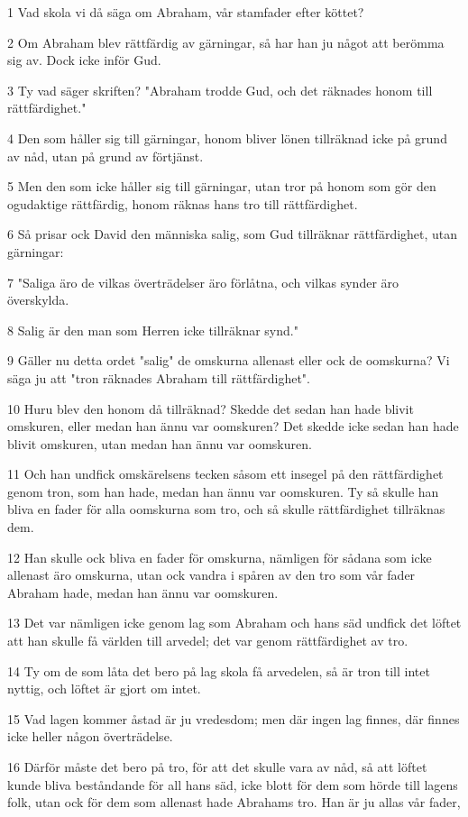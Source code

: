 \par 1 Vad skola vi då säga om Abraham, vår stamfader efter köttet?
\par 2 Om Abraham blev rättfärdig av gärningar, så har han ju något att berömma sig av. Dock icke inför Gud.
\par 3 Ty vad säger skriften? "Abraham trodde Gud, och det räknades honom till rättfärdighet."
\par 4 Den som håller sig till gärningar, honom bliver lönen tillräknad icke på grund av nåd, utan på grund av förtjänst.
\par 5 Men den som icke håller sig till gärningar, utan tror på honom som gör den ogudaktige rättfärdig, honom räknas hans tro till rättfärdighet.
\par 6 Så prisar ock David den människa salig, som Gud tillräknar rättfärdighet, utan gärningar:
\par 7 "Saliga äro de vilkas överträdelser äro förlåtna, och vilkas synder äro överskylda.
\par 8 Salig är den man som Herren icke tillräknar synd."
\par 9 Gäller nu detta ordet "salig" de omskurna allenast eller ock de oomskurna? Vi säga ju att "tron räknades Abraham till rättfärdighet".
\par 10 Huru blev den honom då tillräknad? Skedde det sedan han hade blivit omskuren, eller medan han ännu var oomskuren? Det skedde icke sedan han hade blivit omskuren, utan medan han ännu var oomskuren.
\par 11 Och han undfick omskärelsens tecken såsom ett insegel på den rättfärdighet genom tron, som han hade, medan han ännu var oomskuren. Ty så skulle han bliva en fader för alla oomskurna som tro, och så skulle rättfärdighet tillräknas dem.
\par 12 Han skulle ock bliva en fader för omskurna, nämligen för sådana som icke allenast äro omskurna, utan ock vandra i spåren av den tro som vår fader Abraham hade, medan han ännu var oomskuren.
\par 13 Det var nämligen icke genom lag som Abraham och hans säd undfick det löftet att han skulle få världen till arvedel; det var genom rättfärdighet av tro.
\par 14 Ty om de som låta det bero på lag skola få arvedelen, så är tron till intet nyttig, och löftet är gjort om intet.
\par 15 Vad lagen kommer åstad är ju vredesdom; men där ingen lag finnes, där finnes icke heller någon överträdelse.
\par 16 Därför måste det bero på tro, för att det skulle vara av nåd, så att löftet kunde bliva beståndande för all hans säd, icke blott för dem som hörde till lagens folk, utan ock för dem som allenast hade Abrahams tro. Han är ju allas vår fader,
